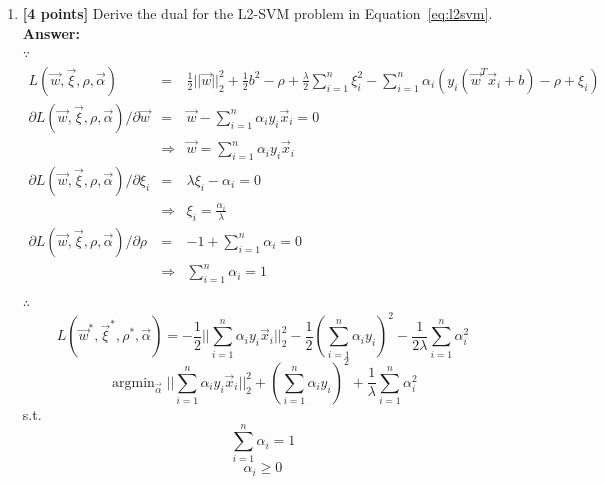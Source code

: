 \documentclass{article}
\DeclareMathOperator*{\argmin}{\mathrm{argmin}}
\begin{document}
\begin{enumerate}[resume]
    \item \textbf{[4 points]} Derive the dual for the L2-SVM problem in Equation~\ref{eq:l2svm}.\\
    \textbf{Answer:}\\
    $\because$
    \begin{equation}
    \nonumber
    \begin{array}{rcl}
    L(\vec{w},\vec{\xi},\rho,\vec{\alpha}) & = & \frac{1}{2}||\vec{w}||_2^2 + \frac{1}{2}b^2 - \rho + \frac{\lambda}{2}\sum_{i=1}^{n}\xi_i^2-\sum_{i=1}^{n}\alpha_i(y_i(\vec{w}^T\vec{x}_i+b)-\rho+\xi_i) \\
    \partial L(\vec{w},\vec{\xi},\rho,\vec{\alpha}) / \partial \vec{w} & = & \vec{w} - \sum_{i=1}^{n}\alpha_iy_i\vec{x}_i = 0 \\
    			& \Rightarrow & \vec{w} = \sum_{i=1}^{n}\alpha_iy_i\vec{x}_i \\
    \partial L(\vec{w},\vec{\xi},\rho,\vec{\alpha}) / \partial \xi_i & = & \lambda\xi_i - \alpha_i = 0 \\
    			& \Rightarrow & \xi_i=\frac{\alpha_i}{\lambda} \\
    \partial L(\vec{w},\vec{\xi},\rho,\vec{\alpha}) / \partial \rho & = &  -1 + \sum_{i=1}^{n}\alpha_i = 0 \\
    			& \Rightarrow & \sum_{i=1}^{n}\alpha_i = 1 \\
    \end{array}
    \end{equation}
    $\therefore$
    $$L(\vec{w}^*,\vec{\xi}^*,\rho^*,\vec{\alpha}) = -\frac{1}{2}||\sum_{i=1}^{n}\alpha_iy_i\vec{x}_i||_2^2 - \frac{1}{2}(\sum_{i=1}^{n}\alpha_iy_i)^2 - \frac{1}{2\lambda}\sum_{i=1}^{n}\alpha_i^2 $$
    $$\argmin_{\vec{\alpha}}||\sum_{i=1}^{n}\alpha_iy_i\vec{x}_i||_2^2 + (\sum_{i=1}^{n}\alpha_iy_i)^2 + \frac{1}{\lambda}\sum_{i=1}^{n}\alpha_i^2 $$
    s.t.
    $$\sum_{i=1}^{n}\alpha_i=1$$
    $$\alpha_i \geq 0$$
    

\end{enumerate}
\end{document}
